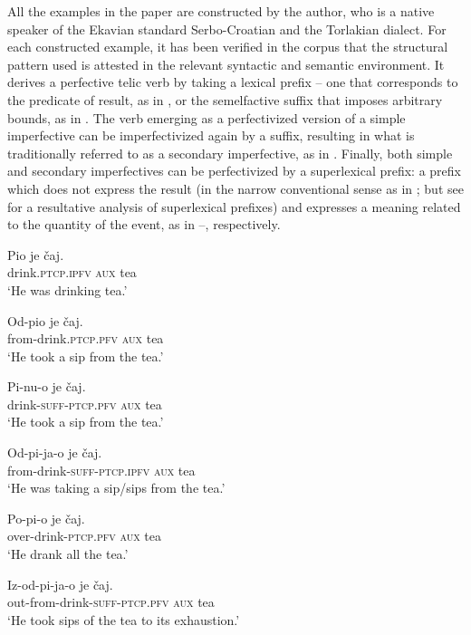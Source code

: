 \documentclass[output=paper]{langscibook}
\begin{document}
{All the examples in the paper are constructed by the author, who is a native speaker of the Ekavian standard Serbo-Croatian and the Torlakian dialect. For each constructed example, it has been verified in the corpus that the structural pattern used is attested in the relevant syntactic and semantic environment.} It derives a perfective telic verb by taking a lexical prefix -- one that corresponds to the predicate of result, as in , or the semelfactive suffix that imposes arbitrary bounds, as in . The verb emerging as a perfectivized version of a simple imperfective can be imperfectivized again by a suffix, resulting in what is traditionally referred to as a secondary imperfective, as in . Finally, both simple and secondary imperfectives can be perfectivized by a superlexical prefix: a prefix which does not express the result (in the narrow conventional sense as in \cite{Ramchand.2004, Svenonius2004b}; but see \cite{Arsenij.2007, Arsenij.2007b, Žaucer.2009} for a resultative analysis of superlexical prefixes) and expresses a meaning related to the quantity of the event, as in --, respectively.\largerpage

\ea\label{ars:ex:SlavAsp}
	\begin{xlist} 
		
	    \ex  \gll Pio je čaj.\\ 
drink.\textsc{ptcp.ipfv} \textsc{aux} tea\\
\glt `He was drinking tea.'\label{ars:ex:SlavAsp-a} 
				
		\ex \gll Od-pio je čaj.\\
from-drink.\textsc{ptcp.pfv} \textsc{aux} tea\\
\glt `He took a sip from the tea.'\label{ars:ex:SlavAsp-b}

		\ex \gll Pi-nu-o je čaj.\\
drink-\textsc{suff-ptcp.pfv} \textsc{aux} tea\\
\glt `He took a sip from the tea.'\label{ars:ex:SlavAsp-b1}

		\ex \gll Od-pi-ja-o je čaj.\\
from-drink\textsc{-suff-ptcp.ipfv} \textsc{aux} tea\\
\glt `He was taking a sip\slash sips from the tea.' \label{ars:ex:SlavAsp-c}

		\ex \gll  Po-pi-o je čaj.\\
over-drink-\textsc{ptcp.pfv} \textsc{aux} tea\\
\glt `He drank all the tea.'\label{ars:ex:SlavAsp-d}

		\ex \gll Iz-od-pi-ja-o je čaj.\\
out-from-drink\textsc{-suff-ptcp.pfv} \textsc{aux} tea\\
\glt `He took sips of the tea to its exhaustion.'\label{ars:ex:SlavAsp-e}
		
	\end{xlist}
\z 
\end{document}
